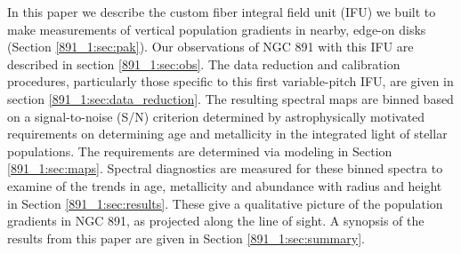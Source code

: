 In this paper we describe the custom fiber integral field unit (IFU)
we built to make measurements of vertical population gradients in
nearby, edge-on disks (Section \ref{891_1:sec:pak}).  Our observations
of NGC 891 with this IFU are described in section \ref{891_1:sec:obs}.
The data reduction and calibration procedures, particularly those
specific to this first variable-pitch IFU, are given in section
\ref{891_1:sec:data_reduction}. The resulting spectral maps are binned
based on a signal-to-noise (S/N) criterion determined by
astrophysically motivated requirements on determining age and
metallicity in the integrated light of stellar populations. The
requirements are determined via modeling in Section
\ref{891_1:sec:maps}. Spectral diagnostics are measured for these
binned spectra to examine of the trends in age, metallicity and
abundance with radius and height in Section \ref{891_1:sec:results}.
These give a qualitative picture of the population gradients in NGC
891, as projected along the line of sight. A synopsis of the results
from this paper are given in Section \ref{891_1:sec:summary}. 




